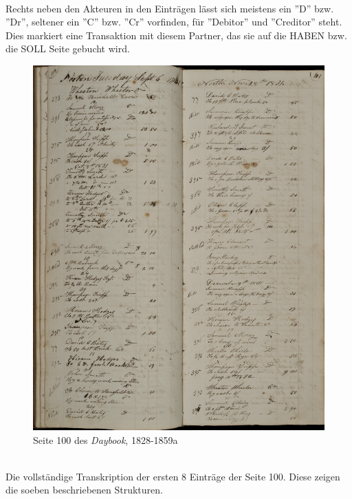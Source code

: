 \documentclass[12pt,a4paper]{article}
\begin{document}
\\
Rechts neben den Akteuren in den Einträgen lässt sich meistens ein ''D'' bzw. ''Dr'', seltener ein ''C'' bzw. ''Cr'' vorfinden, für ''Debitor'' und ''Creditor'' steht. Dies markiert eine Transaktion mit diesem Partner, das sie auf die HABEN bzw. die SOLL Seite gebucht wird.
\begin{figure}
\centering
	\includegraphics[width=1\textwidth]{img/wheaton_100_101.jpg}  
    \caption[Seite 100 des \textit{Daybook, \protect\url{http://hdl.handle.net/11040/17982}}, 1828-1859]{Seite 100 des \textit{Daybook}, 1828-1859a} \label{fig:wheaton}
\end{figure}
\\
Die vollständige Transkription der ersten 8 Einträge der Seite 100. Diese zeigen die soeben beschriebenen Strukturen.
\\
\\
\end{document}
